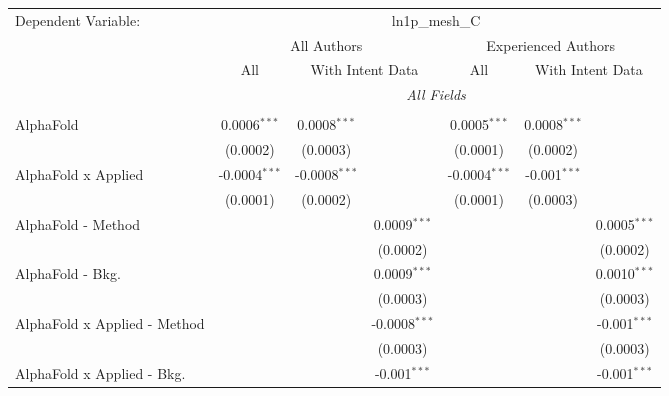 \begingroup
\centering
\begin{tabular}{lcccccc}
   \tabularnewline \midrule \midrule
   Dependent Variable: & \multicolumn{6}{c}{ln1p\_mesh\_C}\\
 & \multicolumn{3}{c}{All Authors} & \multicolumn{3}{c}{Experienced Authors} \\
\cmidrule(lr){2-4} \cmidrule(lr){5-7}
 & \multicolumn{1}{c}{All} & \multicolumn{2}{c}{With Intent Data} & \multicolumn{1}{c}{All} & \multicolumn{2}{c}{With Intent Data} \\
\cmidrule(lr){2-2} \cmidrule(lr){3-4} \cmidrule(lr){5-5} \cmidrule(lr){6-7}
 & \multicolumn{6}{c}{\textit{All Fields}} \\ \\
   AlphaFold                      & 0.0006$^{***}$  & 0.0008$^{***}$  &                 & 0.0005$^{***}$  & 0.0008$^{***}$ &   \\   
                                  & (0.0002)        & (0.0003)        &                 & (0.0001)        & (0.0002)       &   \\   
   AlphaFold x Applied            & -0.0004$^{***}$ & -0.0008$^{***}$ &                 & -0.0004$^{***}$ & -0.001$^{***}$ &   \\   
                                  & (0.0001)        & (0.0002)        &                 & (0.0001)        & (0.0003)       &   \\   
   AlphaFold - Method             &                 &                 & 0.0009$^{***}$  &                 &                & 0.0005$^{***}$\\   
                                  &                 &                 & (0.0002)        &                 &                & (0.0002)\\   
   AlphaFold - Bkg.               &                 &                 & 0.0009$^{***}$  &                 &                & 0.0010$^{***}$\\   
                                  &                 &                 & (0.0003)        &                 &                & (0.0003)\\   
   AlphaFold x Applied - Method   &                 &                 & -0.0008$^{***}$ &                 &                & -0.001$^{***}$\\   
                                  &                 &                 & (0.0003)        &                 &                & (0.0003)\\   
   AlphaFold x Applied - Bkg.     &                 &                 & -0.001$^{***}$  &                 &                & -0.001$^{***}$\\   

\end{tabular}
